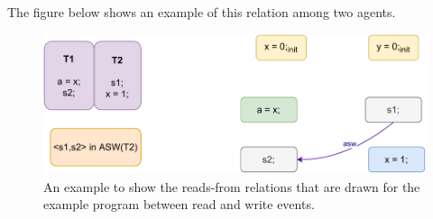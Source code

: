             The figure below shows an example of this relation among two agents. 
            \begin{figure}[H]
                \centering
                \includegraphics[scale=0.7]{ECMAScriptMemoryModel/AgentSyncWith.pdf}
                \caption{An example to show the reads-from relations that are drawn for the example program between read and write events.}
                \label{agent-sync-with}
            \end{figure}
        
